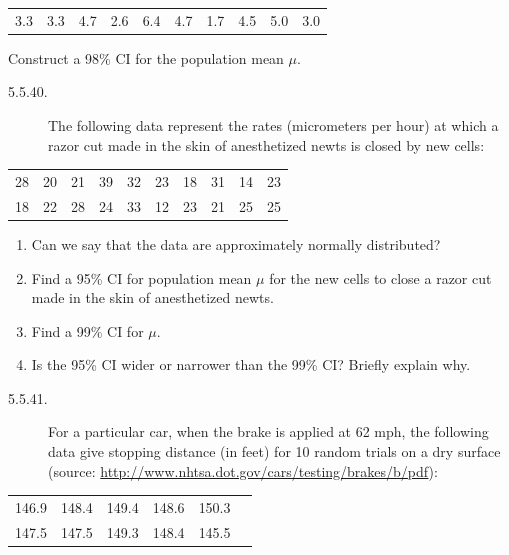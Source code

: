 \begin{center}
\begin{tabular}{cccccccccc}
3.3 & 3.3 & 4.7 & 2.6 & 6.4 & 4.7 & 1.7 & 4.5 & 5.0 & 3.0
\end{tabular}
\end{center}

Construct a 98\% CI for the population mean $\mu$.

\begin{description}
\item[5.5.40.] The following data represent the rates (micrometers per hour) at which a razor cut made in the skin of anesthetized newts is closed by new cells:
\end{description}

\begin{center}
\begin{tabular}{cccccccccc}
28 & 20 & 21 & 39 & 32 & 23 & 18 & 31 & 14 & 23 \\
18 & 22 & 28 & 24 & 33 & 12 & 23 & 21 & 25 & 25
\end{tabular}
\end{center}

\begin{enumerate}
\item[(a)] Can we say that the data are approximately normally distributed?
\item[(b)] Find a 95\% CI for population mean $\mu$ for the new cells to close a razor cut made in the skin of anesthetized newts.
\item[(c)] Find a 99\% CI for $\mu$.
\item[(d)] Is the 95\% CI wider or narrower than the 99\% CI? Briefly explain why.
\end{enumerate}

\begin{description}
\item[5.5.41.] For a particular car, when the brake is applied at 62 mph, the following data give stopping distance (in feet) for 10 random trials on a dry surface (source: \url{http://www.nhtsa.dot.gov/cars/testing/brakes/b/pdf}):
\end{description}

\begin{center}
\begin{tabular}{cccccc}
146.9 & 148.4 & 149.4 & 148.6 & 150.3 \\
147.5 & 147.5 & 149.3 & 148.4 & 145.5
\end{tabular}
\end{center}

